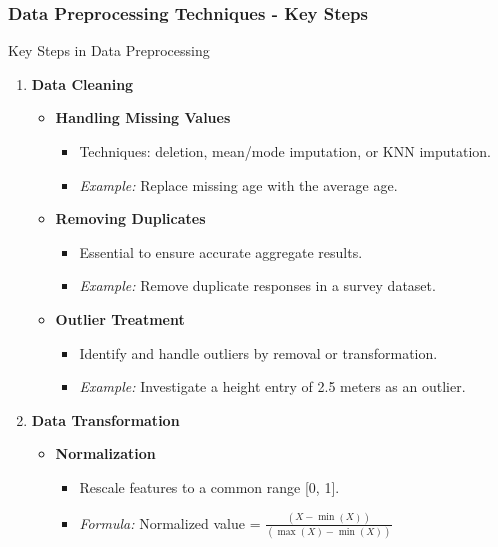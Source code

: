 \documentclass[aspectratio=169]{beamer}
\begin{document}
\begin{frame}[fragile]
    \frametitle{Data Preprocessing Techniques - Key Steps}
    \begin{block}{Key Steps in Data Preprocessing}
        \begin{enumerate}
            \item \textbf{Data Cleaning}
                \begin{itemize}
                    \item \textbf{Handling Missing Values}
                        \begin{itemize}
                            \item Techniques: deletion, mean/mode imputation, or KNN imputation.
                            \item \textit{Example:} Replace missing age with the average age.
                        \end{itemize}
                    \item \textbf{Removing Duplicates}
                        \begin{itemize}
                            \item Essential to ensure accurate aggregate results.
                            \item \textit{Example:} Remove duplicate responses in a survey dataset.
                        \end{itemize}
                    \item \textbf{Outlier Treatment}
                        \begin{itemize}
                            \item Identify and handle outliers by removal or transformation.
                            \item \textit{Example:} Investigate a height entry of 2.5 meters as an outlier.
                        \end{itemize}
                \end{itemize}
            \item \textbf{Data Transformation}
                \begin{itemize}
                    \item \textbf{Normalization}
                        \begin{itemize}
                            \item Rescale features to a common range [0, 1].
                            \item \textit{Formula:} Normalized value = \(\frac{(X - \min(X))}{(\max(X) - \min(X))}\)

\end{itemize}
\end{itemize}
\end{enumerate}
\end{block}
\end{frame}
\end{document}
